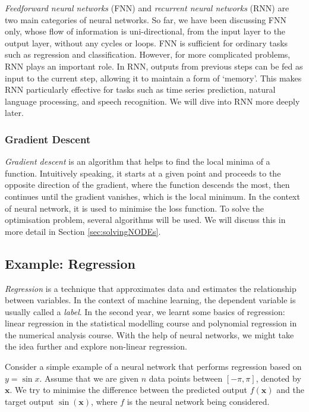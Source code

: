 \documentclass[a4paper,11pt,titlepage]{article}
\theoremstyle{definition}
\theoremstyle{plain}
\theoremstyle{remark}
\begin{document}
\textit{Feedforward neural networks} (FNN) and \textit{recurrent neural networks} (RNN) are two main categories of neural networks. So far, we have been discussing FNN only, whose flow of information is uni-directional, from the input layer to the output layer, without any cycles or loops. FNN is sufficient for ordinary tasks such as regression and classification. However, for more complicated problems, RNN plays an important role. In RNN, outputs from previous steps can be fed as input to the current step, allowing it to maintain a form of ‘memory’. This makes RNN particularly effective for tasks such as time series prediction, natural language processing, and speech recognition. We will dive into RNN more deeply later.

\subsubsection{Gradient Descent}

\textit{Gradient descent} is an algorithm that helps to find the local minima of a function. Intuitively speaking, it starts at a given point and proceeds to the opposite direction of the gradient, where the function descends the most, then continues until the gradient vanishes, which is the local minimum. In the context of neural network, it is used to minimise the loss function. To solve the optimisation problem, several algorithms will be used. We will discuss this in more detail in Section \ref{sec:solvingNODEs}.

\subsection{Example: Regression}

\textit{Regression} is a technique that approximates data and estimates the relationship between variables. In the context of machine learning, the dependent variable is usually called a \textit{label}. In the second year, we learnt some basics of regression: linear regression in the statistical modelling course and polynomial regression in the numerical analysis course. With the help of neural networks, we might take the idea further and explore non-linear regression.

Consider a simple example of a neural network that performs regression based on $y = \sin x$. Assume that we are given $n$ data points between $[-\pi, \pi]$, denoted by $\mathbf{x}$. We try to minimise the difference between the predicted output $f(\mathbf{x})$ and the target output $\sin (\mathbf{x})$, where $f$ is the neural network being considered.
\end{document}
